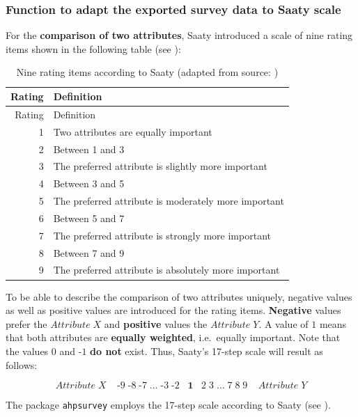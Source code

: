 \documentclass [oneside,10pt,a4paper,ngerman,BCOR10mm,headsepline,parindent,final]{scrartcl}
\begin{document}
    \hypertarget{function-to-adapt-the-exported-survey-data-to-saaty-scale}{%
\subsubsection{Function to adapt the exported survey data to Saaty
scale}\label{function-to-adapt-the-exported-survey-data-to-saaty-scale}}

For the \textbf{comparison of two attributes}, Saaty introduced a scale
of nine rating items shown in the following table (see
\cite{Saaty_AHP_1987}):

\begin{longtable}[]{@{}rl@{}}
\caption{Nine rating items according to Saaty (adapted from source:
\cite{Vignettes_ahpsurvey_2019})}\tabularnewline
\toprule()
Rating & Definition \\
\midrule()
\endfirsthead
\toprule()
Rating & Definition \\
\midrule()
\endhead
1 & Two attributes are equally important \\
2 & Between 1 and 3 \\
3 & The preferred attribute is slightly more important \\
4 & Between 3 and 5 \\
5 & The preferred attribute is moderately more important \\
6 & Between 5 and 7 \\
7 & The preferred attribute is strongly more important \\
8 & Between 7 and 9 \\
9 & The preferred attribute is absolutely more important \\
\bottomrule()
\end{longtable}

To be able to describe the comparison of two attributes uniquely,
negative values as well as positive values are introduced for the rating
items. \textbf{Negative} values prefer the \(Attribute\;X\) and
\textbf{positive} values the \(Attribute\;Y\). A value of \textbf{\(1\)}
means that both attributes are \textbf{equally weighted}, i.e.~equally
important. Note that the values \(0\) and \(\text{-}1\) \textbf{do not}
exist. Thus, Saaty's 17-step scale will result as follows:

\[Attribute\;X\;\;\;\;\text{-}9\;\text{-}8\;\text{-}7\;\ldots\;\text{-}3\;\text{-}2\;\;\;\textbf{1}\;\;\;2\;3\;\ldots\;7\;8\;9\;\;\;\;Attribute\;Y\]

The package \texttt{ahpsurvey} employs the 17-step scale according to
Saaty (see \cite{Vignettes_ahpsurvey_2019}).
\end{document}
